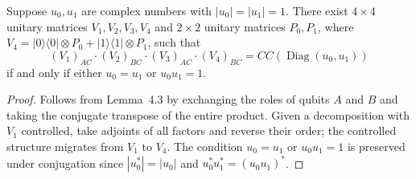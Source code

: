 \begin{lemma}
  \label{lem:s4_4}
  \leanok
  Suppose $u_0, u_1$ are complex numbers with $|u_0| = |u_1| = 1$.
  There exist $4 \times 4$ unitary matrices $V_1, V_2, V_3, V_4$ and
  $2 \times 2$ unitary matrices $P_0, P_1$, where
  $V_4 = |0\rangle\langle 0| \otimes P_0 + |1\rangle\langle 1| \otimes P_1$,
  such that
  \[
    (V_1)_{AC} \cdot (V_2)_{BC} \cdot (V_3)_{AC} \cdot (V_4)_{BC}
    = CC(\operatorname{Diag}(u_0, u_1))
  \]
  if and only if either $u_0 = u_1$ or $u_0 u_1 = 1$.
\end{lemma}

\begin{proof}
  \leanok
  Follows from Lemma~4.3 by exchanging the roles of qubits $A$ and $B$
  and taking the conjugate transpose of the entire product.
  Given a decomposition with $V_1$ controlled, take adjoints of all factors
  and reverse their order; the controlled structure migrates from $V_1$ to $V_4$.
  The condition $u_0 = u_1$ or $u_0 u_1 = 1$ is preserved under conjugation
  since $|u_0^*| = |u_0|$ and $u_0^* u_1^* = (u_0 u_1)^*$.
\end{proof}